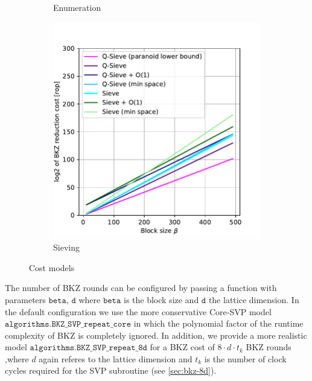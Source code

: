 \begin{figure}[h!]
\begin{subfigure}{0.5\textwidth}
        \caption{Enumeration}\label{fig:costmodels-enum}
    \end{subfigure}
    \begin{subfigure}{0.49\textwidth}
        \centering
        \includegraphics[width=1\textwidth]{graphics/cost_models_sieving.pdf}
        \caption{Sieving}\label{fig:costmodels-sieving}
    \end{subfigure}
    \caption{Cost models}\label{fig:costmodels}
\end{figure}
The number of BKZ rounds can be configured by passing a function with parameters $\texttt{beta, d}$ where $\texttt{beta}$ is the block size and $\texttt{d}$ the lattice dimension. In the default configuration we use the more conservative Core-SVP model $\texttt{algorithms.BKZ\_SVP\_repeat\_core}$ \cite{ADPS16} in which the polynomial factor of the runtime complexity of BKZ is completely ignored. In addition, we provide a more realistic model $\texttt{algorithms.BKZ\_SVP\_repeat\_8d}$ for a BKZ cost of $8 \cdot d \cdot t_k$ BKZ rounds ,where $d$ again referes to the lattice dimension and $t_k$ is the number of clock cycles required for the SVP subroutine (see \cref{sec:bkz-8d}). %


